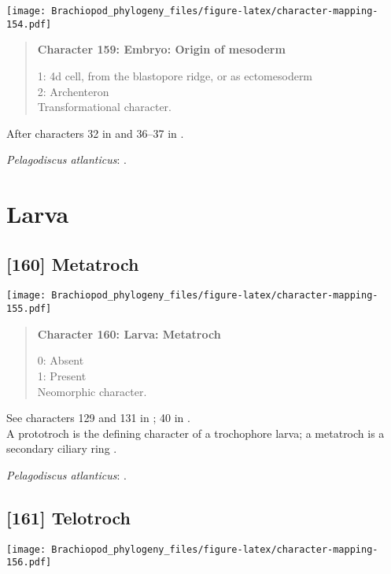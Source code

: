 \documentclass[openany]{book}
\theoremstyle{definition}
\theoremstyle{definition}
\theoremstyle{definition}
\theoremstyle{remark}
\begin{document}
\texttt{[image: Brachiopod\_phylogeny\_files/figure-latex/character-mapping-154.pdf]}

\begin{quote}
\textbf{Character 159: Embryo: Origin of mesoderm}

1: 4d cell, from the blastopore ridge, or as ectomesoderm\\
2: Archenteron\\
Transformational character.
\end{quote}

After characters 32 in \citet{Grobe2007} and 36--37 in
\citet{Glenner2004}.

\hypertarget{Pelagodiscus_atlanticus-coding-159}{}
\emph{Pelagodiscus atlanticus}: \citet{Williams1997Introduction}.

\section{Larva}\label{larva}

\subsection*{{[}160{]} Metatroch}\label{metatroch}

\texttt{[image: Brachiopod\_phylogeny\_files/figure-latex/character-mapping-155.pdf]}

\begin{quote}
\textbf{Character 160: Larva: Metatroch}

0: Absent\\
1: Present\\
Neomorphic character.
\end{quote}

See characters 129 and 131 in \citet{Rouse1999}; 40 in
\citet{Haszprunar1996}.\\
A prototroch is the defining character of a trochophore larva; a
metatroch is a secondary ciliary ring \citep{Rouse1999}.

\hypertarget{Pelagodiscus_atlanticus-coding-160}{}
\emph{Pelagodiscus atlanticus}: \citet{Williams1997Introduction}.

\subsection*{{[}161{]} Telotroch}\label{telotroch}

\texttt{[image: Brachiopod\_phylogeny\_files/figure-latex/character-mapping-156.pdf]}
\end{document}
